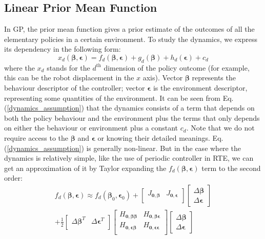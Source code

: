 \subsection{Linear Prior Mean Function}
In GP, the prior mean function gives a prior estimate of the outcomes of all the elementary policies in a certain environment.
To study the dynamics, we express its dependency in the following form:
\begin{equation}
x_d(\bm{\beta}, \bm{\epsilon}) = f_d(\bm{\beta}, \bm{\epsilon}) 
+ g_d(\bm{\beta}) 
+ h_d(\bm{\epsilon}) + c_d 
\label{dynamics_assumption}
\end{equation}
where the $x_d$ stands for the $d^{\text{th}}$ dimension of the policy outcome (for example, this can be the robot displacement in the $x$ axis). Vector $\bm{\beta}$ represents the behaviour descriptor of the controller; vector $\bm{\epsilon}$ is the environment descriptor, representing some quantities of the environment. 
It can be seen from Eq. (\ref{dynamics_assumption}) that the dynamics consists of a term that depends on both the policy behaviour and the environment plus the terms that only depends on either the behaviour or environment plus a constant $c_d$.
Note that we do not require access to the $\bm{\beta}$ and $\bm{\epsilon}$ or knowing their detailed meanings.
Eq. (\ref{dynamics_assumption}) is generally non-linear. But in the case where the dynamics is relatively simple, like the use of periodic controller in RTE, we can get an approximation of it by Taylor expanding the $f_d(\bm{\beta}, \bm{\epsilon})$ term to the second order:
\begin{equation}
\begin{gathered}
f_d(\bm{\beta}, \bm{\epsilon}) \approx
f_d(\bm{\beta}_0, \bm{\epsilon}_0) + 
\begin{bmatrix}
J_{\bm{0, \beta}} & J_{\bm{0, \epsilon}} \\
\end{bmatrix}
%
\begin{bmatrix}
\Delta \bm{\beta} \\
\Delta \bm{\epsilon}
\end{bmatrix}
%
\\
%
+ \frac{1}{2}
\begin{bmatrix}
\Delta \bm{\beta}^T & \Delta \bm{\epsilon}^T \\
\end{bmatrix}
%
\begin{bmatrix}
H_{\bm{0, \beta \beta}} & H_{\bm{0}, \bm{\beta \epsilon}} \\
H_{\bm{0, \epsilon \beta}} & H_{\bm{0, \epsilon \epsilon}} \\
\end{bmatrix}
%
\begin{bmatrix}
\Delta \bm{\beta} \\
\Delta \bm{\epsilon}
\end{bmatrix}
\end{gathered}
\label{Taylor_expansion}
\end{equation}
